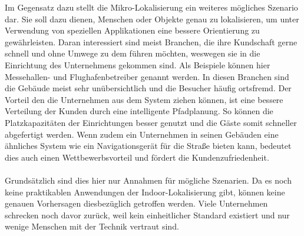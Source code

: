 Im Gegensatz dazu stellt die Mikro-Lokalisierung ein weiteres mögliches Szenario dar. Sie soll dazu dienen, Menschen oder Objekte genau zu lokalisieren, um unter Verwendung von speziellen Applikationen eine bessere Orientierung zu gewährleisten. Daran interessiert sind meist Branchen, die ihre Kundschaft gerne schnell und ohne Umwege zu dem führen möchten, weswegen sie in die Einrichtung des Unternehmens gekommen sind. Als Beispiele können hier Messehallen- und Flughafenbetreiber genannt werden. In diesen Branchen sind die Gebäude meist sehr unübersichtlich und die Besucher häufig ortsfremd. Der Vorteil den die Unternehmen aus dem System ziehen können, ist eine bessere Verteilung der Kunden durch eine intelligente Pfadplanung. So können die Platzkapazitäten der Einrichtungen besser genutzt und die Gäste somit schneller abgefertigt werden. Wenn zudem ein Unternehmen in seinen Gebäuden eine ähnliches System wie ein Navigationsgerät für die Straße bieten kann, bedeutet dies auch einen Wettbewerbsvorteil und fördert die Kundenzufriedenheit. \\ \\
Grundsätzlich sind dies hier nur Annahmen für mögliche Szenarien. Da es noch keine praktikablen Anwendungen der Indoor-Lokalisierung gibt, können keine genauen Vorhersagen diesbezüglich getroffen werden. Viele Unternehmen schrecken noch davor zurück, weil kein einheitlicher Standard existiert und nur wenige Menschen mit der Technik vertraut sind. 
\newpage
